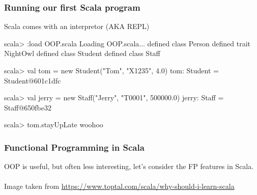 \documentclass{beamer}
\begin{document}


\begin{frame}[fragile]
\frametitle{Running our first Scala program}
Scala comes with an interpretor (AKA REPL)

\begin{code}
scala> :load OOP.scala
Loading OOP.scala...
defined class Person
defined trait NightOwl
defined class Student
defined class Staff

scala> val tom = new Student("Tom", "X1235", 4.0)
tom: Student = Student@601c1dfc

scala> val jerry = new Staff("Jerry", "T0001", 500000.0)
jerry: Staff = Staff@650fbe32

scala> tom.stayUpLate
woohoo
\end{code}
\end{frame}
\begin{frame}[fragile]
\frametitle{Functional Programming in Scala}

OOP is useful, but often less interesting, let's consider the FP
features in Scala. \\
\\ 
{\scriptsize Image taken from \url{https://www.toptal.com/scala/why-should-i-learn-scala}}
\end{frame}
\end{document}
